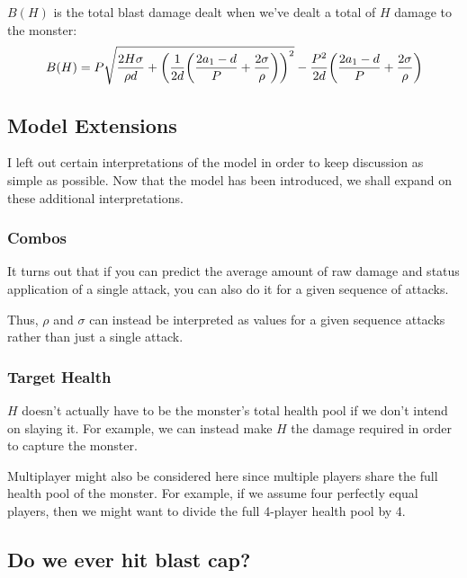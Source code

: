 \documentclass{article}
\begin{document}
$B(H)$ is the total blast damage dealt when we've dealt a total of $H$ damage to the monster:
\begin{equation}
    B (H)
        = P \sqrt{
            \frac{2 H \sigma}{\rho d}
            + \parens*{\frac{1}{2d} \parens*{\frac{2 a_1 - d}{P} + \frac{2 \sigma}{\rho}}}^2
        }
        - \frac{P^2}{2d} \parens*{\frac{2 a_1 - d}{P} + \frac{2 \sigma}{\rho}}
\end{equation}


\subsection{Model Extensions}%
\label{sub:model_extensions}

I left out certain interpretations of the model in order to keep discussion as simple as possible. Now that the model has been introduced, we shall expand on these additional interpretations.

\subsubsection{Combos}%
\label{ssub:combos}

It turns out that if you can predict the average amount of raw damage and status application of a single attack, you can also do it for a given sequence of attacks.

Thus, $\rho$ and $\sigma$ can instead be interpreted as values for a given sequence attacks rather than just a single attack.

\subsubsection{Target Health}%
\label{ssub:target_health}

$H$ doesn't actually have to be the monster's total health pool if we don't intend on slaying it. For example, we can instead make $H$ the damage required in order to capture the monster.

Multiplayer might also be considered here since multiple players share the full health pool of the monster. For example, if we assume four perfectly equal players, then we might want to divide the full 4-player health pool by 4.


\subsection{Do we ever hit blast cap?}%
\label{sub:do_we_ever_hit_blast_cap_}
\end{document}
